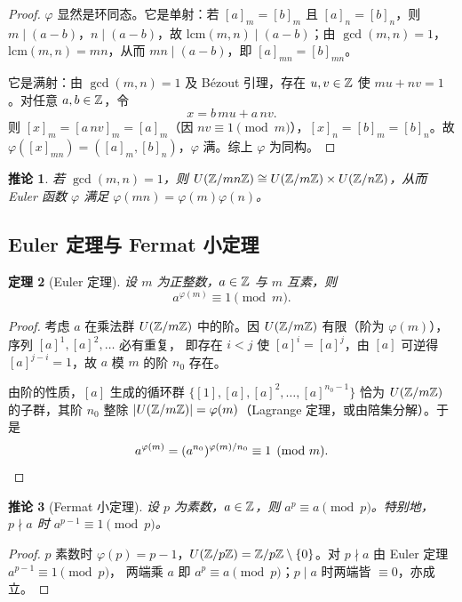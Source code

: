 \documentclass{article}
\theoremstyle{plain}
\newtheorem{thm}{定理}[section]
\newtheorem{cor}[thm]{推论}
\theoremstyle{definition}
\theoremstyle{remark}
\begin{document}
\begin{proof}
  $\varphi$ 显然是环同态。它是单射：若 $[a]_m=[b]_m$ 且 $[a]_n=[b]_n$，则 $m\mid(a-b)$，$n\mid(a-b)$，故 $\mathrm{lcm}(m,n)\mid(a-b)$；由 $\gcd(m,n)=1$，$\mathrm{lcm}(m,n)=mn$，从而 $mn\mid(a-b)$，即 $[a]_{mn}=[b]_{mn}$。

  它是满射：由 $\gcd(m,n)=1$ 及 Bézout 引理，存在 $u,v\in\mathbb{Z}$ 使 $mu+nv=1$。对任意 $a,b\in\mathbb{Z}$，令
  \[
    x=b\,mu+a\,nv.
  \]
  则 $[x]_m=[a\,nv]_m=[a]_m$（因 $nv\equiv1\pmod m$），$[x]_n=[b]_m=[b]_n$。故 $\varphi([x]_{mn})=([a]_m,[b]_n)$，$\varphi$ 满。综上 $\varphi$ 为同构。
\end{proof}

\begin{cor}\label{cor:crt-unit}
  若 $\gcd(m,n)=1$，则 $U(\mathbb{Z}/mn\mathbb{Z})\cong U(\mathbb{Z}/m\mathbb{Z})\times U(\mathbb{Z}/n\mathbb{Z})$，从而 Euler 函数 $\varphi$ 满足 $\varphi(mn)=\varphi(m)\varphi(n)$。
\end{cor}

\subsection{Euler 定理与 Fermat 小定理}

\begin{thm}[Euler 定理]\label{thm:euler}
  设 $m$ 为正整数，$a\in\mathbb{Z}$ 与 $m$ 互素，则
  \[
    a^{\varphi(m)}\equiv1\pmod m.
  \]
\end{thm}

\begin{proof}
  考虑 $a$ 在乘法群 $U(\mathbb{Z}/m\mathbb{Z})$ 中的阶。因 $U(\mathbb{Z}/m\mathbb{Z})$ 有限（阶为 $\varphi(m)$），序列 $[a]^1,[a]^2,\dots$ 必有重复，
  即存在 $i<j$ 使 $[a]^i=[a]^j$，由 $[a]$ 可逆得 $[a]^{j-i}=1$，故 $a$ 模 $m$ 的阶 $n_0$ 存在。

  由阶的性质，$[a]$ 生成的循环群 $\{[1],[a],[a]^2,\dots,[a]^{n_0-1}\}$ 恰为 $U(\mathbb{Z}/m\mathbb{Z})$ 的子群，其阶 $n_0$ 整除 $|U(\mathbb{Z}/m\mathbb{Z})|=\varphi(m)$（Lagrange 定理，或由陪集分解）。于是
  \[
    a^{\varphi(m)}=(a^{n_0})^{\varphi(m)/n_0}\equiv1\pmod m. \qedhere
  \]
\end{proof}

\begin{cor}[Fermat 小定理]\label{cor:fermat-little}
  设 $p$ 为素数，$a\in\mathbb{Z}$，则 $a^p\equiv a\pmod p$。特别地，$p\nmid a$ 时 $a^{p-1}\equiv1\pmod p$。
\end{cor}

\begin{proof}
  $p$ 素数时 $\varphi(p)=p-1$，$U(\mathbb{Z}/p\mathbb{Z})=\mathbb{Z}/p\mathbb{Z}\setminus\{0\}$。对 $p\nmid a$ 由 Euler 定理 $a^{p-1}\equiv1\pmod p$，
  两端乘 $a$ 即 $a^p\equiv a\pmod p$；$p\mid a$ 时两端皆 $\equiv0$，亦成立。
\end{proof}
\end{document}
